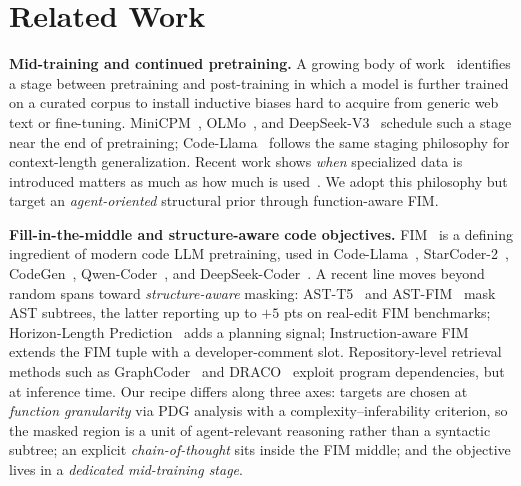 
\section{Related Work}
\vspace{-0.5ex}
\label{sec:related}

\textbf{Mid-training and continued pretraining.}
A growing body of work~\citep{mid-training-survey, gururangan2020dontstop}
identifies a stage between pretraining and post-training in which a model
is further trained on a curated corpus to install inductive biases hard
to acquire from generic web text or fine-tuning. MiniCPM~\citep{minicpm},
OLMo~\citep{olmo}, and DeepSeek-V3~\citep{deepseekv3} schedule such a
stage near the end of pretraining; Code-Llama~\citep{codellama} follows
the same staging philosophy for context-length generalization. Recent
work shows \emph{when} specialized data is introduced matters as much as
how much is used~\citep{remit, frontload-reasoning}. We adopt this
philosophy but target an \emph{agent-oriented} structural prior through
function-aware FIM.

\textbf{Fill-in-the-middle and structure-aware code objectives.}
FIM~\citep{bavarian2022fim, fried2022incoder} is a defining ingredient
of modern code LLM pretraining, used in
Code-Llama~\citep{codellama}, StarCoder-2~\citep{starcoder2},
CodeGen~\citep{codegen}, Qwen-Coder~\citep{qwencoder}, and
DeepSeek-Coder~\citep{deepseekcoder}.
A recent line moves beyond random spans toward \emph{structure-aware}
masking: AST-T5~\citep{ast-t5} and AST-FIM~\citep{ast-fim} mask AST
subtrees, the latter reporting up to $+5$ pts on real-edit FIM
benchmarks; Horizon-Length Prediction~\citep{hlp} adds a planning signal;
Instruction-aware FIM~\citep{ifim} extends the FIM tuple with a
developer-comment slot. Repository-level retrieval methods such as
GraphCoder~\citep{graphcoder} and DRACO~\citep{draco} exploit program
dependencies, but at inference time. Our recipe differs along three
axes: targets are chosen at \emph{function granularity} via PDG analysis
with a complexity--inferability criterion, so the masked region is a
unit of agent-relevant reasoning rather than a syntactic subtree; an
explicit \emph{chain-of-thought} sits inside the FIM middle; and the
objective lives in a \emph{dedicated mid-training stage}.

